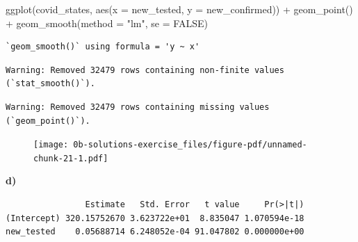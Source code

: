 \documentclass[
  letterpaper,
  DIV=11,
  numbers=noendperiod]{scrreprt}
\newenvironment{Shaded}{\begin{snugshade}}{\end{snugshade}}
\newcommand{\AttributeTok}[1]{\textcolor[rgb]{0.40,0.45,0.13}{#1}}
\newcommand{\ConstantTok}[1]{\textcolor[rgb]{0.56,0.35,0.01}{#1}}
\newcommand{\FunctionTok}[1]{\textcolor[rgb]{0.28,0.35,0.67}{#1}}
\newcommand{\NormalTok}[1]{\textcolor[rgb]{0.00,0.23,0.31}{#1}}
\newcommand{\OtherTok}[1]{\textcolor[rgb]{0.00,0.23,0.31}{#1}}
\newcommand{\SpecialCharTok}[1]{\textcolor[rgb]{0.37,0.37,0.37}{#1}}
\newcommand{\StringTok}[1]{\textcolor[rgb]{0.13,0.47,0.30}{#1}}
\theoremstyle{definition}
\theoremstyle{remark}
\begin{document}
\begin{Shaded}
\begin{Highlighting}[]
\FunctionTok{ggplot}\NormalTok{(covid\_states, }\FunctionTok{aes}\NormalTok{(}\AttributeTok{x =}\NormalTok{ new\_tested, }\AttributeTok{y =}\NormalTok{ new\_confirmed)) }\SpecialCharTok{+}
  \FunctionTok{geom\_point}\NormalTok{() }\SpecialCharTok{+}
  \FunctionTok{geom\_smooth}\NormalTok{(}\AttributeTok{method =} \StringTok{"lm"}\NormalTok{, }\AttributeTok{se =} \ConstantTok{FALSE}\NormalTok{)}
\end{Highlighting}
\end{Shaded}

\begin{verbatim}
`geom_smooth()` using formula = 'y ~ x'
\end{verbatim}

\begin{verbatim}
Warning: Removed 32479 rows containing non-finite values (`stat_smooth()`).
\end{verbatim}

\begin{verbatim}
Warning: Removed 32479 rows containing missing values (`geom_point()`).
\end{verbatim}

\begin{figure}[H]

{\centering \texttt{[image: 0b-solutions-exercise\_files/figure-pdf/unnamed-chunk-21-1.pdf]}

}

\end{figure}

\textbf{d)}

\begin{Shaded}
\end{Shaded}

\begin{verbatim}
                Estimate   Std. Error   t value     Pr(>|t|)
(Intercept) 320.15752670 3.623722e+01  8.835047 1.070594e-18
new_tested    0.05688714 6.248052e-04 91.047802 0.000000e+00
\end{verbatim}
\end{document}
